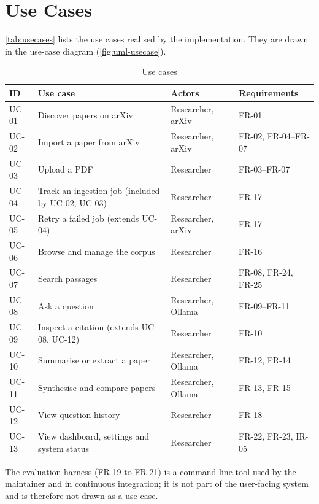 \section{Use Cases}

\autoref{tab:usecases} lists the use cases realised by the implementation. They are drawn in the use-case diagram
(\autoref{fig:uml-usecase}).

\begin{table}[htbp]
  \centering
  \caption{Use cases}\label{tab:usecases}
  {\small
  \begin{tabularx}{\textwidth}{@{}lLll@{}}
    \toprule
    \textbf{ID} & \textbf{Use case} & \textbf{Actors} & \textbf{Requirements} \\
    \midrule
    UC-01 & Discover papers on arXiv & Researcher, arXiv & FR-01 \\
    UC-02 & Import a paper from arXiv & Researcher, arXiv & FR-02, FR-04--FR-07 \\
    UC-03 & Upload a PDF & Researcher & FR-03--FR-07 \\
    UC-04 & Track an ingestion job (included by UC-02, UC-03) & Researcher & FR-17 \\
    UC-05 & Retry a failed job (extends UC-04) & Researcher, arXiv & FR-17 \\
    UC-06 & Browse and manage the corpus & Researcher & FR-16 \\
    UC-07 & Search passages & Researcher & FR-08, FR-24, FR-25 \\
    UC-08 & Ask a question & Researcher, Ollama & FR-09--FR-11 \\
    UC-09 & Inspect a citation (extends UC-08, UC-12) & Researcher & FR-10 \\
    UC-10 & Summarise or extract a paper & Researcher, Ollama & FR-12, FR-14 \\
    UC-11 & Synthesise and compare papers & Researcher, Ollama & FR-13, FR-15 \\
    UC-12 & View question history & Researcher & FR-18 \\
    UC-13 & View dashboard, settings and system status & Researcher & FR-22, FR-23, IR-05 \\
    \bottomrule
  \end{tabularx}
  }
\end{table}

The evaluation harness (FR-19 to FR-21) is a command-line tool used by the maintainer and in continuous integration;
it is not part of the user-facing system and is therefore not drawn as a use case.

